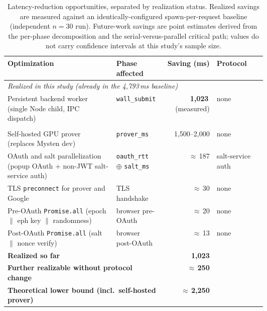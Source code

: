 \begin{table}[h]
\centering
\small
\caption{Latency-reduction opportunities, separated by realization
status. Realized savings are measured against an identically-configured
spawn-per-request baseline (independent $n=30$ run). Future-work savings
are point estimates derived from the per-phase decomposition and the
serial-versus-parallel critical path; values do not carry confidence
intervals at this study's sample size.}
\label{tab:opt}
\begin{tabular}{p{0.42\linewidth}p{0.18\linewidth}rl}
\toprule
\textbf{Optimization} & \textbf{Phase affected} & \textbf{Saving (ms)} & \textbf{Protocol} \\
\midrule
\multicolumn{4}{l}{\emph{Realized in this study (already in the 4{,}793\,ms baseline)}} \\
Persistent backend worker (single Node child, IPC dispatch)
                                            & \texttt{wall\_submit} & \textbf{1{,}023}\,(measured) & none \\
\addlinespace
\multicolumn{4}{l}{\emph{Future work (further headroom from current baseline)}} \\
Self-hosted GPU prover (replaces Mysten dev) & \texttt{prover\_ms} & 1{,}500--2{,}000 & none \\
OAuth and salt parallelization (popup OAuth + non-JWT salt-service auth)
                                             & \texttt{oauth\_rtt} \(\oplus\) \texttt{salt\_ms}
                                                              & $\approx$\,187 & salt-service auth \\
TLS \texttt{preconnect} for prover and Google
                                             & TLS handshake   & $\approx$\,30 & none \\
Pre-OAuth \texttt{Promise.all} (epoch \(\parallel\) eph key \(\parallel\) randomness)
                                             & browser pre-OAuth & $\approx$\,20 & none \\
Post-OAuth \texttt{Promise.all} (salt \(\parallel\) nonce verify)
                                             & browser post-OAuth & $\approx$\,13 & none \\
\midrule
\multicolumn{2}{l}{\textbf{Realized so far}}
                                                                & \textbf{1{,}023} & \\
\multicolumn{2}{l}{\textbf{Further realizable without protocol change}}
                                                                & \textbf{$\approx$\,250} & \\
\multicolumn{2}{l}{\textbf{Theoretical lower bound (incl.\ self-hosted prover)}}
                                                                & \textbf{$\approx$\,2{,}250} & \\
\bottomrule
\end{tabular}
\end{table}

